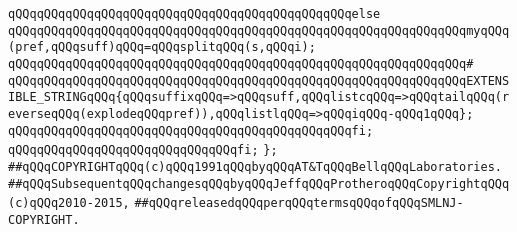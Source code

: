 \verb|qQQqqQQqqQQqqQQqqQQqqQQqqQQqqQQqqQQqqQQqqQQqqQQqelse|\newline
\verb|qQQqqQQqqQQqqQQqqQQqqQQqqQQqqQQqqQQqqQQqqQQqqQQqqQQqqQQqqQQqqQQqmyqQQq(pref,qQQqsuff)qQQq=qQQqsplitqQQq(s,qQQqi);|\newline
\verb|qQQqqQQqqQQqqQQqqQQqqQQqqQQqqQQqqQQqqQQqqQQqqQQqqQQqqQQqqQQqqQQq#|\newline
\verb|qQQqqQQqqQQqqQQqqQQqqQQqqQQqqQQqqQQqqQQqqQQqqQQqqQQqqQQqqQQqqQQqEXTENSIBLE_STRINGqQQq{qQQqsuffixqQQq=>qQQqsuff,qQQqlistcqQQq=>qQQqtailqQQq(reverseqQQq(explodeqQQqpref)),qQQqlistlqQQq=>qQQqiqQQq-qQQq1qQQq};|\newline
\verb|qQQqqQQqqQQqqQQqqQQqqQQqqQQqqQQqqQQqqQQqqQQqqQQqfi;|\newline
\verb|qQQqqQQqqQQqqQQqqQQqqQQqqQQqqQQqfi;|\newline
\verb|};|\newline
\newline
\newline
\verb|##qQQqCOPYRIGHTqQQq(c)qQQq1991qQQqbyqQQqAT&TqQQqBellqQQqLaboratories.|\newline
\verb|##qQQqSubsequentqQQqchangesqQQqbyqQQqJeffqQQqProtheroqQQqCopyrightqQQq(c)qQQq2010-2015,|\newline
\verb|##qQQqreleasedqQQqperqQQqtermsqQQqofqQQqSMLNJ-COPYRIGHT.|\newline

